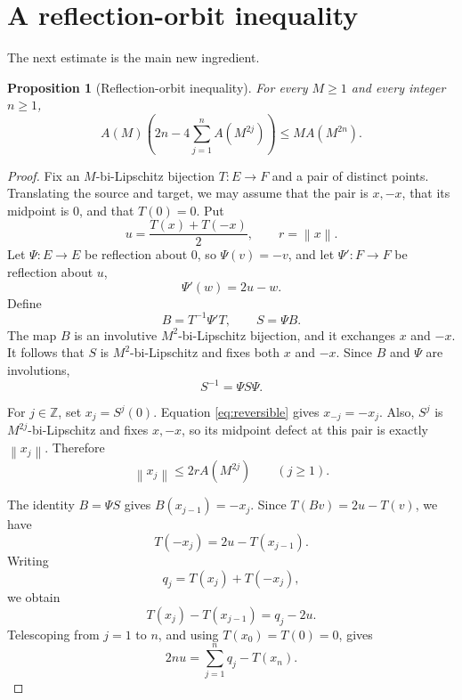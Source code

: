 \documentclass[11pt]{article}
\newtheorem{proposition}[theorem]{Proposition}
\theoremstyle{remark}
\newcommand{\norm}[1]{\left\lVert #1\right\rVert}
\begin{document}
\section{A reflection-orbit inequality}

The next estimate is the main new ingredient.

\begin{proposition}[Reflection-orbit inequality]\label{prop:orbit}
For every $M\ge1$ and every integer $n\ge1$,
\begin{equation}\label{eq:orbit}
 A(M)\left(2n-4\sum_{j=1}^n A(M^{2j})\right)
 \le M A(M^{2n}).
\end{equation}
\end{proposition}

\begin{proof}
Fix an $M$-bi-Lipschitz bijection $T:E\to F$ and a pair of distinct
points.  Translating the source and target, we may assume that the pair is
$x,-x$, that its midpoint is $0$, and that $T(0)=0$.  Put
\[
 u=\frac{T(x)+T(-x)}2,
 \qquad r=\norm{x}.
\]
Let $\Psi:E\to E$ be reflection about $0$, so $\Psi(v)=-v$, and let
$\Psi':F\to F$ be reflection about $u$,
\[
 \Psi'(w)=2u-w.
\]
Define
\[
 B=T^{-1}\Psi'T,
 \qquad S=\Psi B.
\]
The map $B$ is an involutive $M^2$-bi-Lipschitz bijection, and it exchanges
$x$ and $-x$.  It follows that $S$ is $M^2$-bi-Lipschitz and fixes both
$x$ and $-x$.  Since $B$ and $\Psi$ are involutions,
\begin{equation}\label{eq:reversible}
 S^{-1}=\Psi S\Psi.
\end{equation}

For $j\in\mathbb Z$, set $x_j=S^j(0)$.  Equation
\eqref{eq:reversible} gives $x_{-j}=-x_j$.  Also, $S^j$ is
$M^{2j}$-bi-Lipschitz and fixes $x,-x$, so its midpoint defect at this pair
is exactly $\norm{x_j}$.  Therefore
\begin{equation}\label{eq:orbit-size}
 \norm{x_j}\le 2r A(M^{2j})
 \qquad(j\ge1).
\end{equation}

The identity $B=\Psi S$ gives $B(x_{j-1})=-x_j$.  Since
$T(Bv)=2u-T(v)$, we have
\[
 T(-x_j)=2u-T(x_{j-1}).
\]
Writing
\[
 q_j=T(x_j)+T(-x_j),
\]
we obtain
\[
 T(x_j)-T(x_{j-1})=q_j-2u.
\]
Telescoping from $j=1$ to $n$, and using $T(x_0)=T(0)=0$, gives
\begin{equation}\label{eq:telescope}
 2nu=\sum_{j=1}^nq_j-T(x_n).
\end{equation}


\end{proof}
\end{document}
